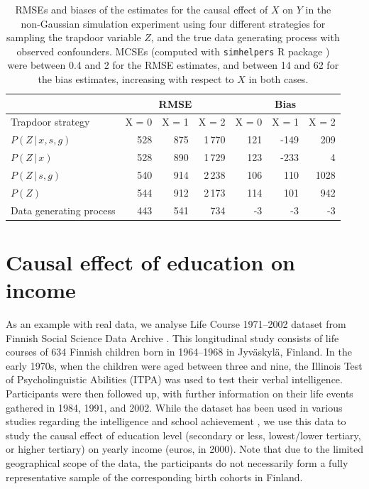 \documentclass[11pt,a4paper,twoside]{article}
\newcommand{\+}[1]{\ensuremath{\mathbf{#1}}}
\newcommand{\given}{{ \, | \, }}
\begin{document}
\begin{table}[h]
	\caption{RMSEs and biases of the estimates for the causal effect of $X$ on $Y$ in the non-Gaussian simulation experiment using four different strategies for sampling the trapdoor variable $Z$, and the true data generating process with observed confounders. MCSEs (computed with \texttt{simhelpers} R package \citep{simhelpers}) were between 0.4 and 2 for the RMSE estimates, and between 14 and 62 for the bias estimates, increasing with respect to $X$ in both cases.}
	\label{table:nongaussian-results}
	\centering
	\begin{tabular}{l|rrr|rrr}
		&		\multicolumn{3}{c|}{RMSE}	&		\multicolumn{3}{c}{Bias} \\
		\hline
		Trapdoor strategy & X = 0 & X = 1 & X = 2 & X = 0 & X = 1 & X = 2 \\
		\hline
		$P(Z \given x, s, g)$ & 528 & 875 & 1\,770 & 121 & -149 & 209\\
		$P(Z \given x)$       & 528 & 890 & 1\,729 & 123 & -233 & 4 \\
		$P(Z \given s, g)$    & 540 & 914 & 2\,238 & 106 & 110  & 1028\\
		$P(Z)$                & 544 & 912 & 2\,173 & 114 & 101  & 942 \\
		Data generating process                   & 443 & 541 & 734    & -3  & -3   & -3 \\
	\end{tabular}
\end{table}

\section{Causal effect of education on income}
	\label{sec:real-data-example}
	
	As an example with real data, we analyse Life Course 1971--2002 dataset from Finnish Social Science Data Archive \citep{fsd}. This longitudinal study consists of life courses of 634 Finnish children born in 1964--1968 in Jyv\"askyl\"a, Finland. In the early 1970s, when the children were aged between three and nine, the Illinois Test of Psycholinguistic Abilities (ITPA) was used to test their verbal intelligence. Participants were then followed up, with further information on their life events gathered in 1984, 1991, and 2002. While the dataset has been used in various studies regarding the intelligence and school achievement \citep[see, e.g.,][]{Kuusinen1988}, we use this data to study the causal effect of education level (secondary or less, lowest/lower tertiary, or higher tertiary) on yearly income (euros, in 2000). Note that due to the limited geographical scope of the data, the participants do not necessarily form a fully representative sample of the corresponding birth cohorts in Finland.
	
\end{document}
